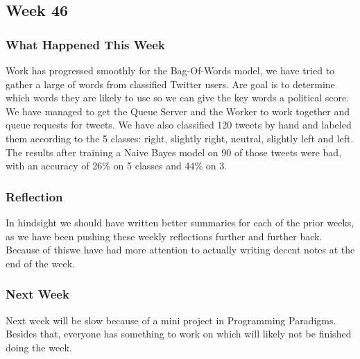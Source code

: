 \subsection{Week 46} 
\subsubsection{What Happened This Week} 
Work has progressed smoothly for the Bag-Of-Words model, we have tried to gather
a large of words from classified Twitter users. Are goal is to determine which
words they are likely to use so we can give the key words a political score. We
have managed to get the Queue Server and the Worker to work together and
queue requests for tweets. We have also classified 120 tweets by hand and
labeled them according to the 5 classes: right, slightly right, neutral,
slightly left and left. The results after training a Naive Bayes model on 90 of
those tweets were bad, with an accuracy of 26\% on 5 classes and 44\% on 3.

\subsubsection{Reflection} 
In hindsight we should have written better summaries for each of the prior
weeks, as we have been pushing these weekly reflections further and further
back. Because of thiswe have had more attention to actually writing decent notes
at the end of the week.

\subsubsection{Next Week} 
Next week will be slow because of a mini project in Programming Paradigms.
Besides that, everyone has something to work on which will likely not be
finished doing the week.



